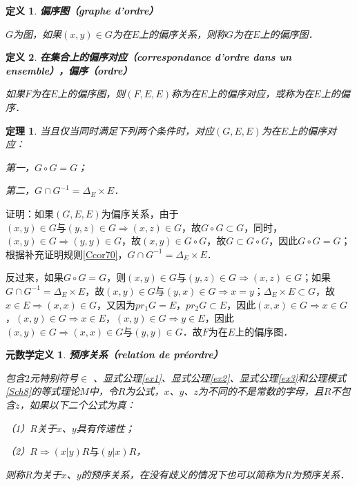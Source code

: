 \documentclass[12pt, a4paper, oneside]{book}
\newtheorem{metadef}{元数学定义}
\newtheorem{theo}{定理}
\newtheorem{de}{定义}
\begin{document}
			\begin{de}
				\textbf{偏序图（graphe d'ordre）}
				\par
				$G$为图，如果$(x, y)\in G$为在$E$上的偏序关系，则称$G$为在$E$上的偏序图．
			\end{de}

			\begin{de}
				\textbf{在集合上的偏序对应（correspondance d'ordre dans un ensemble），偏序（ordre）}
				\par
				如果$F$为在$E$上的偏序图，则$(F, E, E)$称为在$E$上的偏序对应，或称为在$E$上的偏序．
			\end{de}

			\begin{theo}
				当且仅当同时满足下列两个条件时，对应$(G, E, E)$为在$E$上的偏序对应：
				\par
				第一，$G\circ G=G$；
				\par
				第二，$G\cap G^{-1}=\Delta_E\times E$．
			\end{theo}
			证明：如果$(G, E, E)$为偏序关系，由于$(x, y)\in G\text{与}(y, z) \in G\Rightarrow (x, z)\in G$，故$G\circ G\subset G$，同时，$(x, y)\in G\Rightarrow (y, y)\in G$，故$(x, y)\in G\circ G$，故$G\subset G\circ G$，因此$G\circ G=G$；根据补充证明规则\ref{Ccor70}，$G\cap G^{-1}=\Delta_E\times E$．
			\par
			反过来，如果$G\circ G=G$，则$(x, y)\in G\text{与}(y, z) \in G\Rightarrow (x, z)\in G$；如果$G\cap G^{-1}=\Delta_E\times E$，故$(x, y)\in G\text{与}(y, x)\in G\Rightarrow x=y$；$\Delta_E\times E\subset G$，故$x\in E\Rightarrow (x, x)\in G$，又因为$pr_1G=E$，$pr_2G\subset E$，因此$(x, x)\in G\Rightarrow x\in G$，$(x, y)\in G\Rightarrow x\in E$，$(x, y)\in G\Rightarrow y\in E$，因此$(x, y)\in G\Rightarrow (x, x)\in G\text{与}(y, y)\in G$．故$F$为在$E$上的偏序图．
			
			\begin{metadef}
				\textbf{预序关系（relation de préordre）}
				\par
				包含$2$元特别符号$\in$ 、显式公理\ref{ex1}、显式公理\ref{ex2}、显式公理\ref{ex3}和公理模式\ref{Sch8}的等式理论$M$中，令$R$为公式，$x$、$y$、$z$为不同的不是常数的字母，且$R$不包含$z$，如果以下二个公式为真：
				\par
				（1）$R$关于$x$、$y$具有传递性；
				\par
				（2）$R\Rightarrow (x|y)R\text{与}(y|x)R$，
				\par
				则称$R$为关于$x$、$y$的预序关系，在没有歧义的情况下也可以简称为$R$为预序关系．
			\end{metadef}
						
\end{document}

